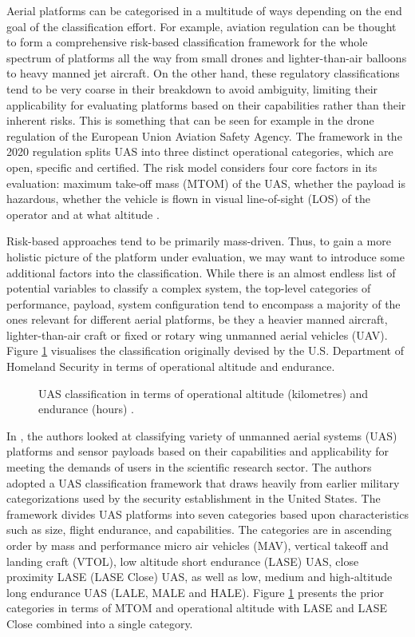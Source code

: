 \documentclass[english, 12pt, a4paper, elec, utf8, a-1b, online]{aaltothesis}
\begin{document}
Aerial platforms can be categorised in a multitude of ways depending on the end goal of the classification effort.
For example, aviation regulation can be thought to form a comprehensive risk-based classification framework for the whole spectrum of platforms all the way from small drones and lighter-than-air balloons to heavy manned jet aircraft.
On the other hand, these regulatory classifications tend to be very coarse in their breakdown to avoid ambiguity, limiting their applicability for evaluating platforms based on their capabilities rather than their inherent risks.
This is something that can be seen for example in the drone regulation of the European Union Aviation Safety Agency.
The framework in the 2020 regulation splits UAS into three distinct operational categories, which are open, specific and certified.
The risk model considers four core factors in its evaluation: maximum take-off mass (MTOM) of the UAS, whether the payload is hazardous, whether the vehicle is flown in visual line-of-sight (LOS) of the operator and at what altitude \cite{alamouri2021exploratory}.

Risk-based approaches tend to be primarily mass-driven. Thus, to gain a more holistic picture of the platform under evaluation, we may want to introduce some additional factors into the classification.
While there is an almost endless list of potential variables to classify a complex system, the top-level categories of performance, payload, system configuration tend to encompass a majority of the ones relevant for different aerial platforms, be they a heavier manned aircraft, lighter-than-air craft or fixed or rotary wing unmanned aerial vehicles (UAV).
Figure \ref{fig-3d-dhs-uas-classification} visualises the classification originally devised by the U.S.
Department of Homeland Security in terms of operational altitude and endurance.

\begin{figure}[h]
  \centering
  
  \caption{UAS classification in terms of operational altitude (kilometres) and endurance (hours) \cite{watts2012unmanned}.}
  \label{fig-3d-dhs-uas-classification}
\end{figure}

In \cite{watts2012unmanned}, the authors looked at classifying variety of unmanned aerial systems (UAS) platforms and sensor payloads based on their capabilities and applicability for meeting the demands of users in the scientific research sector.
The authors adopted a UAS classification framework that draws heavily from earlier military categorizations used by the security establishment in the United States.
The framework divides UAS platforms into seven categories based upon characteristics such as size, flight endurance, and capabilities.
The categories are in ascending order by mass and performance micro air vehicles (MAV), vertical takeoff and landing craft (VTOL), low altitude short endurance (LASE) UAS, close proximity LASE (LASE Close) UAS, as well as low, medium and high-altitude long endurance UAS (LALE, MALE and HALE).
Figure \ref{fig-3d-dhs-uas-classification} presents the prior categories in terms of MTOM and operational altitude with LASE and LASE Close combined into a single category.
\end{document}
